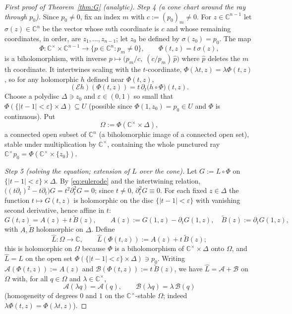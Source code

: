 \documentclass[11pt]{article}
\theoremstyle{plain}
\theoremstyle{definition}
\newcommand{\C}{\mathbb{C}}
\newcommand{\Eu}{\mathcal{E}}
\begin{document}
\begin{proof}[First proof of Theorem~\ref{thm:G} (analytic)]
\emph{Step 4 (a cone chart around the ray through $p_0$).} Since
$p_0\ne0$, fix an index $m$ with $c:=(p_0)_m\ne0$. For $z\in\C^{n-1}$ let
$\sigma(z)\in\C^n$ be the vector whose $m$th coordinate is $c$ and whose
remaining coordinates, in order, are $z_1,\dots,z_{n-1}$; let $z_0$ be
defined by $\sigma(z_0)=p_0$. The map
\[
\Phi:\C^{\times}\times\C^{n-1}\longrightarrow
\{p\in\C^n:p_m\ne0\},\qquad
\Phi(t,z)=t\,\sigma(z),
\]
is a biholomorphism, with inverse
$p\mapsto\bigl(p_m/c,\;(c/p_m)\,\hat p\bigr)$ where $\hat p$ deletes the
$m$th coordinate. It intertwines scaling with the $t$-coordinate,
$\Phi(\lambda t,z)=\lambda\Phi(t,z)$, so for any holomorphic $h$ defined
near $\Phi(t,z)$,
\[
(\Eu h)(\Phi(t,z))=t\,\partial_t\bigl(h\circ\Phi\bigr)(t,z).
\]
Choose a polydisc $\Delta\ni z_0$ and $\varepsilon\in(0,1)$ so small that
$\Phi(\{|t-1|<\varepsilon\}\times\Delta)\subseteq U$ (possible since
$\Phi(1,z_0)=p_0\in U$ and $\Phi$ is continuous). Put
\[
\Omega:=\Phi(\C^{\times}\times\Delta),
\]
a connected open subset of $\C^n$ (a biholomorphic image of a connected
open set), stable under multiplication by $\C^{\times}$, containing the
whole punctured ray $\C^{\times}p_0=\Phi(\C^{\times}\times\{z_0\})$.

\emph{Step 5 (solving the equation; extension of $L$ over the cone).}
Let $G:=L\circ\Phi$ on $\{|t-1|<\varepsilon\}\times\Delta$. By
\eqref{eq:eulerode} and the intertwining relation,
$\bigl((t\partial_t)^2-t\partial_t\bigr)G=t^2\partial_t^2G=0$; since
$t\ne0$, $\partial_t^2G\equiv0$. For each fixed $z\in\Delta$ the function
$t\mapsto G(t,z)$ is holomorphic on the disc $\{|t-1|<\varepsilon\}$ with
vanishing second derivative, hence affine in $t$:
\[
G(t,z)=A(z)+t\,\widetilde B(z),\qquad
A(z):=G(1,z)-\partial_tG(1,z),\quad
\widetilde B(z):=\partial_tG(1,z),
\]
with $A,\widetilde B$ holomorphic on $\Delta$. Define
\[
\widehat L:\Omega\to\C,\qquad
\widehat L(\Phi(t,z)):=A(z)+t\,\widetilde B(z);
\]
this is holomorphic on $\Omega$ because $\Phi$ is a biholomorphism of
$\C^{\times}\times\Delta$ onto $\Omega$, and $\widehat L=L$ on the open
set $\Phi(\{|t-1|<\varepsilon\}\times\Delta)\ni p_0$. Writing
$\mathcal A(\Phi(t,z)):=A(z)$ and
$\mathcal B(\Phi(t,z)):=t\,\widetilde B(z)$, we have
$\widehat L=\mathcal A+\mathcal B$ on $\Omega$ with, for all $q\in\Omega$
and $\lambda\in\C^{\times}$,
\[
\mathcal A(\lambda q)=\mathcal A(q),\qquad
\mathcal B(\lambda q)=\lambda\,\mathcal B(q)
\]
(homogeneity of degrees $0$ and $1$ on the $\C^{\times}$-stable
$\Omega$; indeed $\lambda\Phi(t,z)=\Phi(\lambda t,z)$).


\end{proof}
\end{document}
